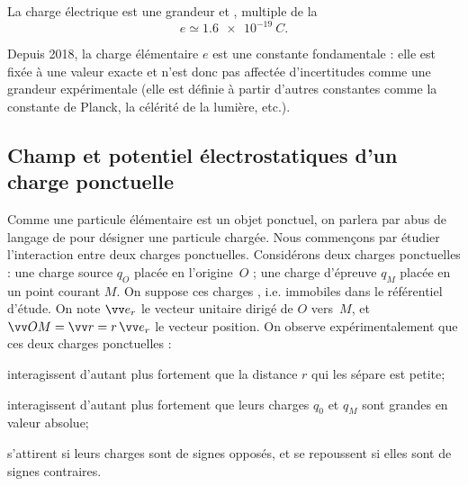 \documentclass[12pt,fancy]{cours}
\begin{document}
\begin{prop}\label{prop:}
  La charge électrique est une grandeur  et , multiple de la  
  \begin{equation*}
  e\simeq\SI{1,6e-19}{C}.
  \end{equation*}
\end{prop}
\begin{remarque}
  Depuis 2018, la charge élémentaire $e$ est une constante fondamentale : elle est fixée à une valeur exacte et n’est donc pas affectée d’incertitudes comme une grandeur expérimentale (elle est définie à partir d’autres constantes comme la constante de Planck, la célérité de la lumière, etc.). 
\end{remarque}


%

\subsection{Champ et potentiel électrostatiques d'un charge ponctuelle}
\label{subsec:coulomb_champ_electrostat}

 Comme une particule élémentaire est un objet ponctuel, on parlera par abus de langage de  pour désigner une particule chargée. Nous commençons par étudier l’interaction entre deux charges ponctuelles. Considérons deux charges ponctuelles : une charge source $q_O$ placée en l’origine~$O$ ; une charge d’épreuve  $q_M$ placée en un point courant $M$. On suppose ces charges , i.e. immobiles dans le référentiel d’étude. On note $\er$ le vecteur unitaire dirigé de $O$ vers~$M$, et $\Vec{OM}=\Vec{r} = r \,\er$ le vecteur position. On observe expérimentalement que ces deux charges ponctuelles :
\begin{liste}
  \item interagissent d’autant plus fortement que la distance $r$ qui les sépare est petite;
\item interagissent d’autant plus fortement que leurs charges $q_0$ et $q_M$ sont grandes en valeur absolue;
\item s’attirent si leurs charges sont de signes opposés, et se repoussent si elles sont de signes contraires.
\end{liste}
\end{document}
